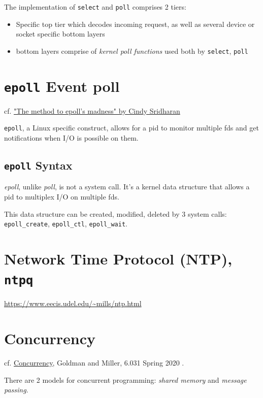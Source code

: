 \documentclass[10pt]{amsart}
\begin{document}
\begin{multicols*}{2}
The implementation of \texttt{select} and \texttt{poll} comprises 2 tiers:
\begin{itemize}
	\item Specific top tier which decodes incoming request, as well as several device or socket specific bottom layers
	\item bottom layers comprise of \emph{kernel poll functions} used both by \texttt{select}, \texttt{poll}
\end{itemize}

\section{\texttt{epoll} Event poll}

cf. \href{https://medium.com/@copyconstruct/the-method-to-epolls-madness-d9d2d6378642}{"The method to epoll's madness" by Cindy Sridharan}\cite{Srid2017}

\texttt{epoll}, a Linux specific construct, allows for a pid to monitor multiple fds and get notifications when I/O is possible on them. 


\subsection{\texttt{epoll} Syntax}

\emph{epoll}, unlike \emph{poll}, is not a system call. It's a kernel data structure that allows a pid to multiplex I/O on multiple fds.

This data structure can be created, modified, deleted by 3 system calls: \texttt{epoll\_create}, \texttt{epoll\_ctl}, \texttt{epoll\_wait}.


\section{Network Time Protocol (NTP), \texttt{ntpq}}

\url{https://www.eecis.udel.edu/~mills/ntp.html}

\section{Concurrency}

cf. \href{http://web.mit.edu/6.031/www/sp20/classes/20-concurrency/}{Concurrency}, Goldman and Miller, 6.031 Spring 2020 \cite{6dot005and6dot031}. 

There are 2 models for concurrent programming: \emph{shared memory} and \emph{message passing}. 


\end{multicols*}
\end{document}
